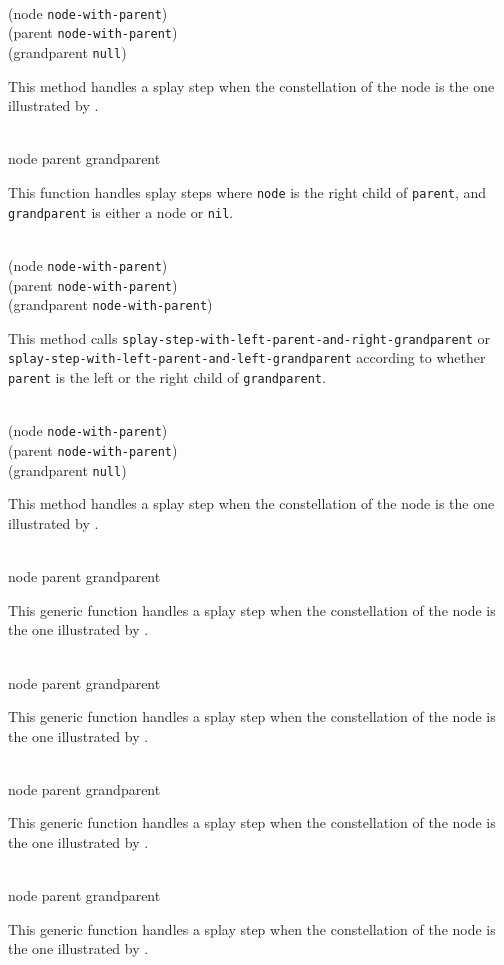 \\
{(node \texttt{node-with-parent})\\
 (parent \texttt{node-with-parent})\\
 (grandparent \texttt{null})}

This method handles a splay step when the constellation of the node is
the one illustrated by .

\\
{node parent grandparent}

This function handles splay steps where \texttt{node} is the right
child of \texttt{parent}, and \texttt{grandparent} is either a node or
\texttt{nil}.

\\
{(node \texttt{node-with-parent})\\
 (parent \texttt{node-with-parent})\\
 (grandparent \texttt{node-with-parent})}

This method calls
\texttt{splay-step-with-left-parent-and-right-grandparent} or
\texttt{splay-step-with-left-parent-and-left-grandparent} according
to whether \texttt{parent} is the left or the right child of
\texttt{grandparent}.

\\
{(node \texttt{node-with-parent})\\
 (parent \texttt{node-with-parent})\\
 (grandparent \texttt{null})}

This method handles a splay step when the constellation of the node is
the one illustrated by .

\\
{node parent grandparent}

This generic function handles a splay step when the constellation of
the node is the one illustrated by .

\\
{node parent grandparent}

This generic function handles a splay step when the constellation of
the node is the one illustrated by .

\\
{node parent grandparent}

This generic function handles a splay step when the constellation of
the node is the one illustrated by .

\\
{node parent grandparent}

This generic function handles a splay step when the constellation of
the node is the one illustrated by .
